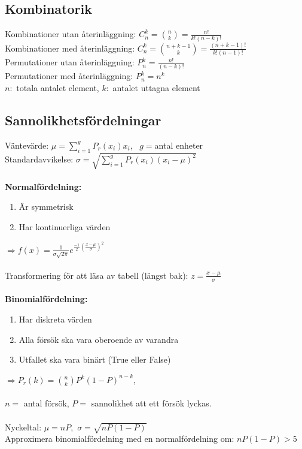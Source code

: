 \documentclass[a4paper,10pt]{article}
\begin{document}
\subsection*{Kombinatorik}
Kombinationer utan återinläggning: $C_n^k = \binom{n}{k} = \frac{n!}{k!(n-k)!}$ \\
Kombinationer med återinläggning: $C_n^k = \binom{n+k-1}{k} = \frac{(n+k-1)!}{k!(n-1)!}$ \\
Permutationer utan återinläggning: $P_n^k = \frac{n!}{(n-k)!}$ \\
Permutationer med återinläggning: $P_n^k = n^k$ \\
$n: $ totala antalet element, $k: $ antalet uttagna element

\newpage

\subsection*{Sannolikhetsfördelningar}
Väntevärde: $\mu = \sum_{i=1}^g P_r(x_i) x_i$, \, $g=$antal enheter \\
Standardavvikelse: $\sigma = \sqrt{\sum_{i=1}^g P_r(x_i) (x_i - \mu)^2}$ \\
\vspace{1mm} \\
{\bf Normalfördelning:}
\begin{enumerate}
    \item{Är symmetrisk}
    \item{Har kontinuerliga värden}
\end{enumerate}
$\Rightarrow f(x)=\frac{1}{\sigma\sqrt{2\pi}}e^{\frac{-1}{2}(\frac{x-\mu}{\sigma})^2}$ \\
\vspace{1mm}\\
Transformering för att läsa av tabell (längst bak): $z = \frac{x-\mu}{\sigma}$ \\
\vspace{1mm} \\
{\bf Binomialfördelning:}
\begin{enumerate}
    \item{Har diskreta värden}
    \item{Alla försök ska vara oberoende av varandra}
    \item{Utfallet ska vara binärt (True eller False)}
\end{enumerate}
$\Rightarrow P_r(k) = \binom{n}{k} P^k(1-P)^{n-k}$, \\
\, \\
$n=$ antal försök, $P=$ sannolikhet att ett försök lyckas. \\
\, \\
Nyckeltal: $\mu=nP$,\, $\sigma=\sqrt{nP(1-P)}$ \\
Approximera binomialfördelning med en normalfördelning om: $nP(1-P) > 5$
\vspace{1cm} \\
\end{document}
